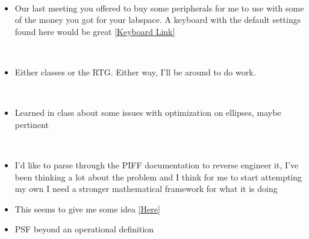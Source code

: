 \documentclass[a4 paper]{article}
\numberwithin{equation}{section}
\newcommand{\0}{\mathbf{0}}
\begin{document}
\\ 
\begin{itemize}
    \item Our last meeting you offered to buy some peripherals for me to use with some of the money you got for your labspace. A keyboard with the default settings found here would be great \href{https://system76.com/accessories/launch_lite_sa_1/configure}{[Keyboard Link]}
\end{itemize}
\\ 
\begin{itemize}
    \item Either classes or the RTG. Either way, I'll be around to do work.
\end{itemize}
\\ 
\begin{itemize}
    \item Learned in class about some issues with optimization on ellipses, maybe pertinent
\end{itemize}
\\ 
\begin{itemize}
    \item I'd like to parse through the PIFF documentation to reverse engineer it, I've been thinking a lot about the problem and I think for me to start attempting my own I need a stronger mathematical framework for what it is doing
    \item This seems to give me some idea \href{http://rmjarvis.github.io/Piff/_build/html/model.html}{[Here]}
    \item PSF beyond an operational definition
\end{itemize}
\newpage



\newpage
\end{document}
